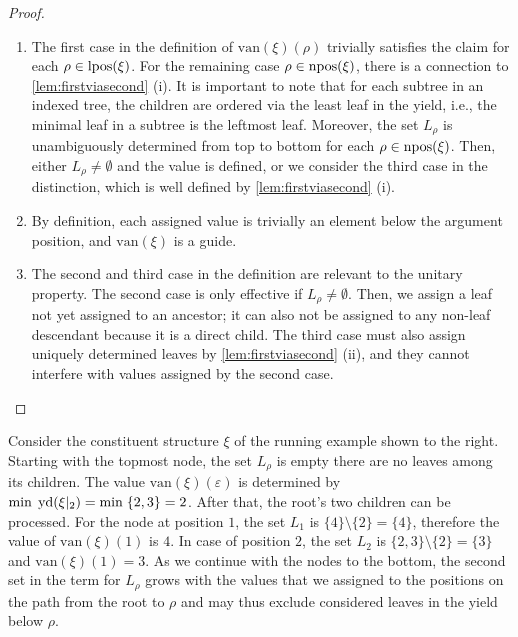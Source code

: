 \documentclass[../../document.tex]{subfiles}
\begin{document}
    \begin{proof}
        \begin{enumerate}
            \item
                The first case in the definition of \(\mathrm{van}(\xi)(\rho)\) trivially satisfies the claim for each \(\rho \in \operatorname{lpos}(\xi)\).
                For the remaining case \(\rho \in \operatorname{npos}(\xi)\), there is a connection to \cref{lem:firstviasecond} (i).
                It is important to note that for each subtree in an indexed tree, the children are ordered via the least leaf in the yield, i.e., the minimal leaf in a subtree is the leftmost leaf.
                Moreover, the set \(L_\rho\) is unambiguously determined from top to bottom for each \(\rho \in \operatorname{npos}(\xi)\).
                Then, either \(L_\rho \neq \emptyset\) and the value is defined, or we consider the third case in the distinction, which is well defined by \cref{lem:firstviasecond} (i).
            \item
                By definition, each assigned value is trivially an element below the argument position, and \(\mathrm{van}(\xi)\) is a guide.
            \item
                The second and third case in the definition are relevant to the unitary property.
                The second case is only effective if \(L_\rho \neq \emptyset\).
                Then, we assign a leaf not yet assigned to an ancestor; it can also not be assigned to any non-leaf descendant because it is a direct child.
                The third case must also assign uniquely determined leaves by \cref{lem:firstviasecond} (ii), and they cannot interfere with values assigned by the second case.
        \end{enumerate}
    \end{proof}

    \begin{wrapfigure}[6]{r}{.3\linewidth}
        \centering
        
    \end{wrapfigure}
    Consider the constituent structure \(\xi\) of the running example shown to the right.
    Starting with the topmost node, the set \(L_\rho\) is empty there are no leaves among its children.
    The value \(\mathrm{van}(\xi)(\varepsilon)\) is determined by \(\min\;\operatorname{yd}(\xi|_{2}) = \min\;\{2,3\} = 2\).
    After that, the root's two children can be processed.
    For the node at position \(1\), the set \(L_{1}\) is \(\{4\} \setminus \{2\} = \{4\}\), therefore the value of \(\mathrm{van}(\xi)(1)\) is \(4\).
    In case of position \(2\), the set \(L_{2}\) is \(\{2,3\} \setminus \{2\} = \{3\}\) and \(\mathrm{van}(\xi)(1)=3\).
    As we continue with the nodes to the bottom, the second set in the term for \(L_\rho\) grows with the values that we assigned to the positions on the path from the root to \(\rho\) and may thus exclude considered leaves in the yield below \(\rho\).
    \exampleqed
\end{document}
